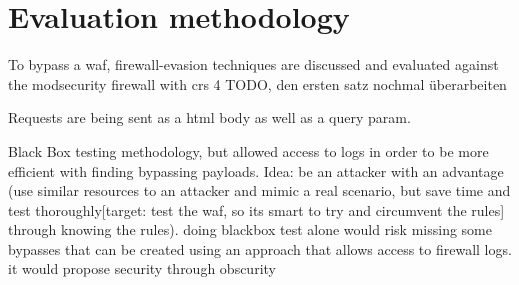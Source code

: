 \section{Evaluation methodology}
\label{sec:evaluation}
To bypass a waf, firewall-evasion techniques are discussed and evaluated against the modsecurity firewall with crs 4 {\color{red} TODO, den ersten satz nochmal überarbeiten}

Requests are being sent as a html body as well as a query param.

Black Box testing methodology, but allowed access to logs in order to be more efficient with finding bypassing payloads. Idea: be an attacker with an advantage (use similar resources to an attacker and mimic a real scenario, but save time and test thoroughly[target: test the waf, so its smart to try and circumvent the rules] through knowing the rules). doing blackbox test alone would risk missing some bypasses that can be created using an approach that allows access to firewall logs. it would propose security through obscurity
